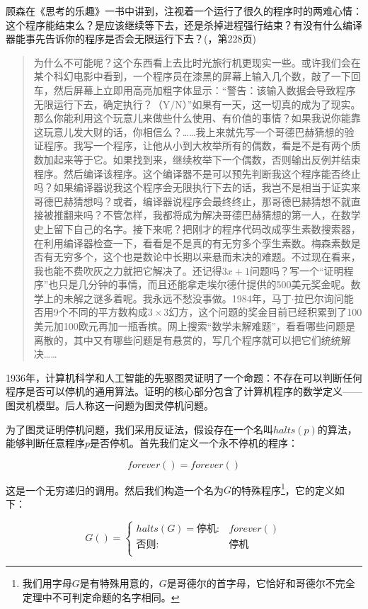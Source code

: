 \documentclass{article}
\begin{document}
顾森在《思考的乐趣》一书中讲到，注视着一个运行了很久的程序时的两难心情：这个程序能结束么？是应该继续等下去，还是杀掉进程强行结束？有没有什么编译器能事先告诉你的程序是否会无限运行下去？(\cite{GuSen-2012}，第228页)

\begin{quotation}
为什么不可能呢？这个东西看上去比时光旅行机更现实一些。或许我们会在某个科幻电影中看到，一个程序员在漆黑的屏幕上输入几个数，敲了一下回车，然后屏幕上立即用高亮加粗字体显示：“警告：该输入数据会导致程序无限运行下去，确定执行？（Y/N）”如果有一天，这一切真的成为了现实。那么你能利用这个玩意儿来做些什么使用、有价值的事情？如果我说你能靠这玩意儿发大财的话，你相信么？……我上来就先写一个哥德巴赫猜想的验证程序。我写一个程序，让他从小到大枚举所有的偶数，看是不是有两个质数加起来等于它。如果找到来，继续枚举下一个偶数，否则输出反例并结束程序。然后编译该程序。这个编译器不是可以预先判断我这个程序能否终止吗？如果编译器说我这个程序会无限执行下去的话，我岂不是相当于证实来哥德巴赫猜想吗？或者，编译器说程序会最终终止，那哥德巴赫猜想不就直接被推翻来吗？不管怎样，我都将成为解决哥德巴赫猜想的第一人，在数学史上留下自己的名字。接下来呢？把刚才的程序代码改成孪生素数搜索器，在利用编译器检查一下，看看是不是真的有无穷多个孪生素数。梅森素数是否有无穷多个，这个也是数论中长期以来悬而未决的难题。不过现在看来，我也能不费吹灰之力就把它解决了。还记得$3x+1$问题吗？写一个“证明程序”也只是几分钟的事情，而且还能拿走埃尔德什提供的500美元奖金呢。数学上的未解之谜多着呢。我永远不愁没事做。1984年，马丁$\cdot$拉巴尔询问能否用9个不同的平方数构成$3 \times 3$幻方，这个问题的奖金目前已经积累到了100美元加100欧元再加一瓶香槟。网上搜索“数学未解难题”，看看哪些问题是离散的，其中又有哪些问题是有悬赏的，写几个程序就可以把它们统统解决……
\end{quotation}

1936年，计算机科学和人工智能的先驱图灵证明了一个命题：不存在可以判断任何程序是否可以停机的通用算法。证明的核心部分包含了计算机程序的数学定义——图灵机模型。后人称这一问题为图灵停机问题。

为了图灵证明停机问题，我们采用反证法，假设存在一个名叫$halts(p)$的算法，能够判断任意程序$p$是否停机。首先我们定义一个永不停机的程序：

\[
forever() = forever()
\]

这是一个无穷递归的调用。然后我们构造一个名为$G$的特殊程序\footnote{我们用字母$G$是有特殊用意的，$G$是哥德尔的首字母，它恰好和哥德尔不完全定理中不可判定命题的名字相同。}，它的定义如下：

\[
G() = \begin{cases}
halts(G) = \text{停机}: & forever() \\
\text{否则}: & \text{停机} \\
\end{cases}
\]
\end{document}

